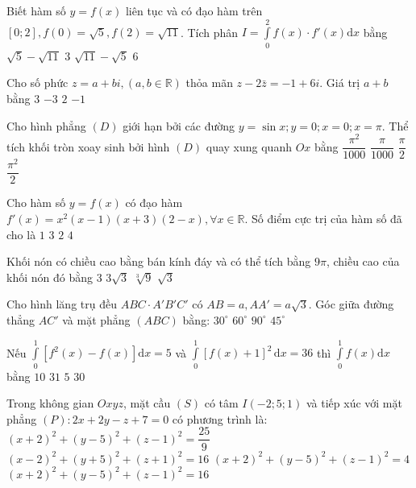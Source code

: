 \begin{ex}%
Biết hàm số $y=f(x)$ liên tục và có đạo hàm trên $[0; 2], f(0)= \sqrt{5}, f(2)=\sqrt{11}$. Tích phân $I=\displaystyle\int\limits_0^2 f(x) \cdot f'(x) \mathrm{d} x$ bằng
\choice
{$\sqrt{5}-\sqrt{11}$}
{\True $3$}
{$\sqrt{11}-\sqrt{5}$}
{$6$}

\end{ex}
\begin{ex}%
Cho số phức $z=a+b i,(a, b \in \mathbb{R})$ thỏa mãn $z-2\bar{z}=-1+6 i$. Giá trị $a+b$ bằng
\choice
{\True $3$}
{$-3$}
{$2$}
{$-1$}

\end{ex}
\begin{ex}%
Cho hình phẳng $(D)$ giới hạn bởi các đường $y=\sin x; y=0; x=  0; x=\pi$. Thể tích khối tròn xoay sinh bởi hình $(D)$ quay xung quanh $O x$ bằng
\choice
{$\dfrac{\pi^2}{1000}$}
{$\dfrac{\pi}{1000}$}
{$\dfrac{\pi}{2}$}
{\True $\dfrac{\pi^2}{2}$}

\end{ex}
\begin{ex}%
Cho hàm số $y=f(x)$ có đạo hàm $f'(x)=x^2(x-1)(x+3)(2- x), \forall x \in \mathbb{R}$. Số điểm cực trị của hàm số đã cho là
\choice
{$1$}
{\True $3$}
{$2$}
{$4$}

\end{ex}
\begin{ex}%
Khối nón có chiều cao bằng bán kính đáy và có thể tích bằng $9\pi$, chiều cao của khối nón đó bằng
\choice
{\True $3$}
{$3\sqrt{3}$}
{$\sqrt[3]{9}$}
{$\sqrt{3}$}

\end{ex}
\begin{ex}%
Cho hình lăng trụ đều $ABC \cdot A'B'C'$ có $AB=a, AA'=a \sqrt{3}$. Góc giữa đường thẳng $AC'$ và mặt phẳng $(ABC)$ bằng:
\choice
{$30^{\circ}$}
{\True $60^{\circ}$}
{$90^{\circ}$}
{$45^{\circ}$}

\end{ex}
\begin{ex}%
Nếu $\displaystyle\int\limits_0^1\left[f^2(x)-f(x)\right] \mathrm{d} x=5$ và $\displaystyle\int\limits_0^1[f(x)+1]^2 \mathrm{\,d} x=36$ thì $\displaystyle\int\limits_0^1 f(x) \mathrm{d} x$ bằng
\choice
{\True $10$}
{$31$}
{$5$}
{$30$}

\end{ex}
\begin{ex}%
Trong không gian $Oxyz$, mặt cầu $(S)$ có tâm $I(-2; 5; 1)$ và tiếp xúc với mặt phẳng $(P)\colon 2 x+2 y-z+7=0$ có phương trình là:
\choice
{$(x+2)^2+(y-5)^2+(z-1)^2=\dfrac{25}{9}$}
{$(x-2)^2+(y+5)^2+(z+1)^2=16$}
{$(x+2)^2+(y-5)^2+(z-1)^2=4$}
{\True $(x+2)^2+(y-5)^2+(z-1)^2=16$}

\end{ex}

